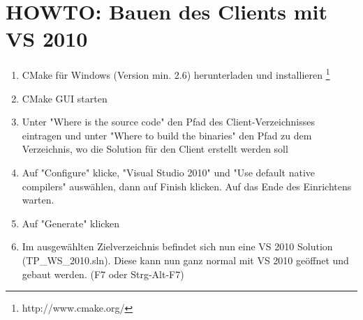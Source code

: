 \section{HOWTO: Bauen des Clients mit VS 2010}
\begin{enumerate}
	\item CMake für Windows (Version min. 2.6) herunterladen und installieren
 \footnote{http://www.cmake.org/}
	\item CMake GUI starten
	\item Unter "Where is the source code" den Pfad des Client-Verzeichnisses
 eintragen und unter "Where to build the binaries" den Pfad zu dem
Verzeichnis, wo die Solution für den Client erstellt werden soll
	\item Auf "Configure" klicke, "Visual Studio 2010" und "Use default
native compilers" auswählen, dann auf Finish klicken. Auf das Ende des
Einrichtens warten.
	\item Auf "Generate" klicken
	\item Im ausgewählten Zielverzeichnis befindet sich nun eine VS 2010
Solution (TP\_WS\_2010.sln). Diese kann nun ganz normal mit VS 2010
geöffnet und gebaut werden. (F7 oder Strg-Alt-F7)
\end{enumerate}

